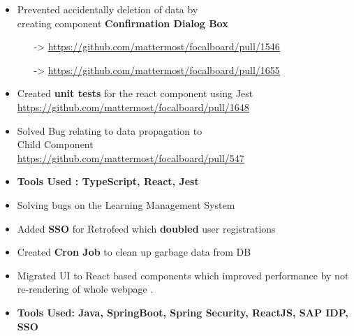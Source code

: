 \documentclass[10pt,a4paper,ragged2e,withhyper]{altacv}
\begin{document}
\begin{paracol}{2}

\begin{itemize}
\item Prevented accidentally deletion of data  by \\ creating component  \textbf{Confirmation Dialog Box}\\ 
\begin{itemize}
    \item[->] \underline{\url{https://github.com/mattermost/focalboard/pull/1546}}
    \item[->] \underline{\url{https://github.com/mattermost/focalboard/pull/1655}}
\end{itemize}

\item Created \textbf{unit tests} for the react component using Jest \\ \underline{\url{https://github.com/mattermost/focalboard/pull/1648}}

\item Solved Bug relating to data propagation to \\ Child Component \\
\underline{\url{https://github.com/mattermost/focalboard/pull/547}}
\item \color{emphasis}\textbf{Tools Used : TypeScript, React, Jest }
\end{itemize}

\divider

\begin{itemize}
\item Solving bugs on the Learning Management System
\end{itemize}

\divider

\begin{itemize}
\item Added \textbf{SSO} for Retrofeed which     \textbf{doubled} user registrations   
\item Created \textbf{Cron Job} to clean up garbage data from DB
\item Migrated UI to React based components which improved performance by not re-rendering of whole webpage .
\color{emphasis}\color{emphasis}\item \textbf{Tools Used: Java, SpringBoot, Spring Security, ReactJS, SAP IDP, SSO}
\end{itemize}


\end{paracol}
\end{document}
